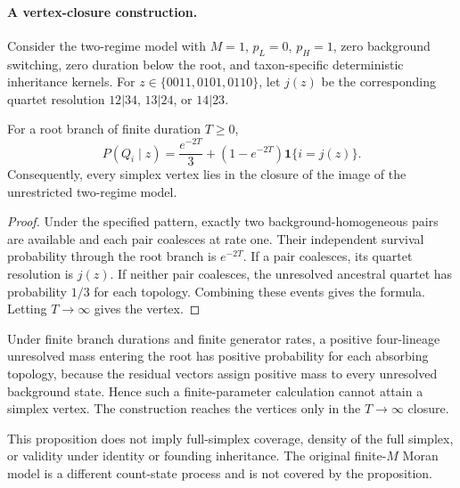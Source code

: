 \paragraph{A vertex-closure construction.}
Consider the two-regime model with $M=1$, $p_L=0$, $p_H=1$, zero background
switching, zero duration below the root, and taxon-specific deterministic
inheritance kernels. For $z\in\{0011,0101,0110\}$, let $j(z)$ be the
corresponding quartet resolution $12|34$, $13|24$, or $14|23$.

\begin{proposition}
For a root branch of finite duration $T\geq0$,
\[
 P(Q_i\mid z)=\frac{e^{-2T}}3+(1-e^{-2T})\mathbf 1\{i=j(z)\}.
\]
Consequently, every simplex vertex lies in the closure of the image of the
unrestricted two-regime model.
\end{proposition}

\begin{proof}
Under the specified pattern, exactly two background-homogeneous pairs are
available and each pair coalesces at rate one. Their independent survival
probability through the root branch is $e^{-2T}$. If a pair coalesces, its
quartet resolution is $j(z)$. If neither pair coalesces, the unresolved
ancestral quartet has probability $1/3$ for each topology. Combining these
events gives the formula. Letting $T\to\infty$ gives the vertex.
\end{proof}

Under finite branch durations and finite generator rates, a positive
four-lineage unresolved mass entering the root has positive probability for
each absorbing topology, because the residual vectors assign positive mass to
every unresolved background state. Hence such a finite-parameter calculation
cannot attain a simplex vertex. The construction reaches the vertices only in
the $T\to\infty$ closure.

This proposition does not imply full-simplex coverage, density of the full
simplex, or validity under identity or founding inheritance. The original
finite-$M$ Moran model is a different count-state process and is not covered
by the proposition.
